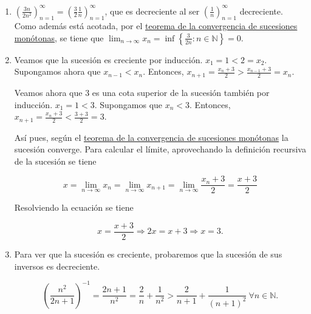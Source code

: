 \documentclass[
  spanish,
  a4paper,
]{scrreport}
\theoremstyle{definition}
\theoremstyle{remark}
\begin{document}
\begin{tcolorbox}[enhanced jigsaw, arc=.35mm, bottomrule=.15mm, bottomtitle=1mm, breakable, colback=white, colbacktitle=quarto-callout-tip-color!10!white, colframe=quarto-callout-tip-color-frame, coltitle=black, left=2mm, leftrule=.75mm, opacityback=0, opacitybacktitle=0.6, rightrule=.15mm, title=\textcolor{quarto-callout-tip-color}{\faLightbulb}\hspace{0.5em}{Solución}, titlerule=0mm, toprule=.15mm, toptitle=1mm]

\begin{enumerate}
\def\labelenumi{\alph{enumi}.}
\item
  \(\left(\frac{3n}{2n^2}\right)_{n=1}^\infty = \left(\frac{3}{2}\frac{1}{n}\right)_{n=1}^\infty\),
  que es decreciente al ser \(\left(\frac{1}{n}\right)_{n=1}^\infty\)
  decreciente. Como además está acotada, por el
  \href{https://aprendeconalf.es/analisis-manual/sucesiones.html\#thm-convergencia-monotona}{teorema
  de la convergencia de sucesiones monótonas}, se tiene que
  \(\lim_{n\to\infty}x_n = \inf\left\{\frac{3}{2n}:n\in\mathbb{N}\right\}=0\).
\item
  Veamos que la sucesión es creciente por inducción. \(x_1=1<2=x_2\).
  Supongamos ahora que \(x_{n-1}<x_n\). Entonces,
  \(x_{n+1} = \frac{x_n+3}{2} > \frac{x_{n-1}+3}{2} = x_n\).

  Veamos ahora que \(3\) es una cota superior de la sucesión también por
  inducción. \(x_1 = 1 < 3\). Supongamos que \(x_n<3\). Entonces,
  \(x_{n+1}=\frac{x_n+3}{2} < \frac{3+3}{2} = 3\).

  Así pues, según el
  \href{https://aprendeconalf.es/analisis-manual/sucesiones.html\#thm-convergencia-monotona}{teorema
  de la convergencia de sucesiones monótonas} la sucesión converge. Para
  calcular el límite, aprovechando la definición recursiva de la
  sucesión se tiene

  \[
   x = \lim_{n\to\infty}x_n = \lim_{n\to\infty}x_{n+1} = \lim_{n\to\infty}\frac{x_n+3}{2} = \frac{x+3}{2}
   \]

  Resolviendo la ecuación se tiene

  \[
   x=\frac{x+3}{2} \Rightarrow 2x=x+3 \Rightarrow x=3.
   \]
\item
  Para ver que la sucesión es creciente, probaremos que la sucesión de
  sus inversos es decreciente.

  \[
   \left(\frac{n^2}{2n+1}\right)^{-1}= \frac{2n+1}{n^2} =\frac{2}{n}+\frac{1}{n^2} > \frac{2}{n+1}+\frac{1}{(n+1)^2}\ \forall n\in\mathbb{N}.
   \]


\end{enumerate}
\end{tcolorbox}
\end{document}
